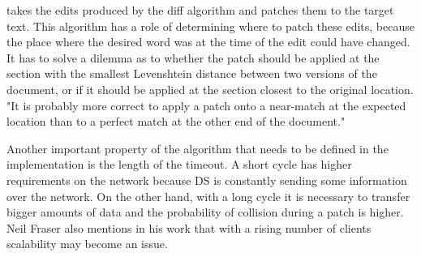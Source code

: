 \documentclass[12pt,oneside]{fithesis2}
\begin{document}
\par \underline{} takes the edits produced by the diff algorithm and patches them to the target text. This algorithm has a role of determining where to patch these edits, because the place where the desired word was at the time of the edit could have changed. It has to solve a dilemma as to whether the patch should be applied at the section with the smallest Levenshtein distance \cite{Levenshtein} between two versions of the document, or if it should be applied at the section closest to the original location. "It is probably more correct to apply a patch onto a near-match at the expected location than to a perfect match at the other end of the document."\cite{Fraser}
\par Another important property of the algorithm that needs to be defined in the implementation is the length of the timeout. A short cycle has higher requirements on the network because DS is constantly sending some information over the network. On the other hand, with a long cycle it is necessary to transfer bigger amounts of data and the probability of collision during a patch is higher. Neil Fraser also mentions in his work that with a rising number of clients scalability may become an issue.
\end{document}
